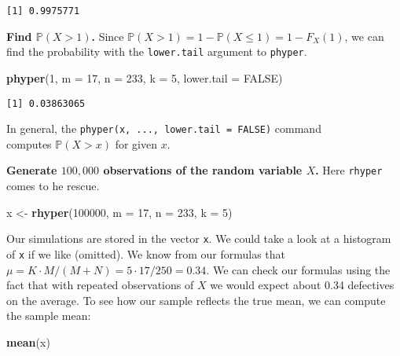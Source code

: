 \documentclass[]{book}
\newenvironment{Shaded}{\begin{snugshade}}{\end{snugshade}}
\newcommand{\KeywordTok}[1]{\textcolor[rgb]{0.13,0.29,0.53}{\textbf{{#1}}}}
\newcommand{\DataTypeTok}[1]{\textcolor[rgb]{0.13,0.29,0.53}{{#1}}}
\newcommand{\DecValTok}[1]{\textcolor[rgb]{0.00,0.00,0.81}{{#1}}}
\newcommand{\StringTok}[1]{\textcolor[rgb]{0.31,0.60,0.02}{{#1}}}
\newcommand{\OtherTok}[1]{\textcolor[rgb]{0.56,0.35,0.01}{{#1}}}
\newcommand{\NormalTok}[1]{{#1}}
\numberwithin{equation}{chapter}
\numberwithin{figure}{chapter}
\theoremstyle{plain}
\theoremstyle{definition}
\theoremstyle{remark}
\theoremstyle{definition}
\theoremstyle{definition}
\theoremstyle{remark}
\begin{document}
\begin{verbatim}
[1] 0.9975771
\end{verbatim}

\textbf{Find \(\mathbb{P}(X>1)\).} Since
\(\mathbb{P}(X>1)=1-\mathbb{P}(X\leq1)=1-F_{X}(1)\), we can find the
probability with the \texttt{lower.tail} argument to \texttt{phyper}.

\begin{Shaded}
\begin{Highlighting}[]
\KeywordTok{phyper}\NormalTok{(}\DecValTok{1}\NormalTok{, }\DataTypeTok{m =} \DecValTok{17}\NormalTok{, }\DataTypeTok{n =} \DecValTok{233}\NormalTok{, }\DataTypeTok{k =} \DecValTok{5}\NormalTok{, }\DataTypeTok{lower.tail =} \OtherTok{FALSE}\NormalTok{)}
\end{Highlighting}
\end{Shaded}

\begin{verbatim}
[1] 0.03863065
\end{verbatim}

In general, the \texttt{phyper(x,\ ...,\ lower.tail\ =\ FALSE)}
command\\
computes \(\mathbb{P}(X > x)\) for given \(x\).

\textbf{Generate \(100,000\) observations of the random variable \(X\).}
Here \texttt{rhyper} comes to he rescue.

\begin{Shaded}
\begin{Highlighting}[]
\NormalTok{x <-}\StringTok{ }\KeywordTok{rhyper}\NormalTok{(}\DecValTok{100000}\NormalTok{, }\DataTypeTok{m =} \DecValTok{17}\NormalTok{, }\DataTypeTok{n =} \DecValTok{233}\NormalTok{, }\DataTypeTok{k =} \DecValTok{5}\NormalTok{)}
\end{Highlighting}
\end{Shaded}

Our simulations are stored in the vector \texttt{x}. We could take a
look at a histogram of \texttt{x} if we like (omitted). We know from our
formulas that \(\mu=K\cdot M/(M+N)=5\cdot17/250=0.34\). We can check our
formulas using the fact that with repeated observations of \(X\) we
would expect about 0.34 defectives on the average. To see how our sample
reflects the true mean, we can compute the sample mean:

\begin{Shaded}
\begin{Highlighting}[]
\KeywordTok{mean}\NormalTok{(x)}
\end{Highlighting}
\end{Shaded}
\end{document}
